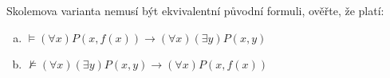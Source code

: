     
\begin{problem} 
    
    Skolemova varianta nemusí být ekvivalentní původní formuli, ověřte, že platí:
    \begin{enumerate}[(a)]
        \item $\models (\forall x)P(x,f(x)) \to (\forall x)(\exists y)P(x,y)$
        \item $\not\models (\forall x)(\exists y)P(x,y)\to (\forall x)P(x,f(x))$
    \end{enumerate}

\end{problem}















 


